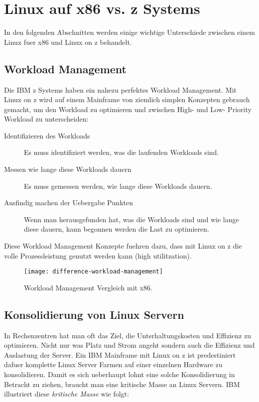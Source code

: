 \chapter{Linux auf x86 vs. z Systems}
\label{cha:Unterschiede}

In den folgenden Abschnitten werden einige wichtige Unterschiede zwischen einem Linux fuer x86 und Linux on z behandelt.

\section{Workload Management}
\label{sec:WorkloadManagement}

Die IBM z Systems haben ein nahezu perfektes Workload Management.
Mit Linux on z wird auf einem Mainframe von ziemlich simplen Konzepten gebrauch gemacht, um den Workload zu optimieren
und zwischen High- und Low- Priority Workload zu unterscheiden:\cite{IBMRedBookWorkloadConcept}

\begin{description}
    \item[Identifizieren des Workloads]{Es muss identifiziert werden, was die laufenden Workloads sind.}
    \item[Messen wie lange diese Workloads dauern]{Es muss gemessen werden, wie lange diese Workloads dauern.}
    \item[Ausfindig machen der Uebergabe Punkten]{Wenn man herausgefunden hat, was die Workloads sind und wie lange diese dauern, kann begonnen werden die Last zu optimieren.}
\end{description}

\newpage
Diese Workload Management Konzepte fuehren dazu, dass mit Linux on z die volle Prozessleistung genutzt werden kann (high utilitzation).

\begin{figure}[h!]
\centering
\texttt{[image: difference-workload-management]}
\caption{Workload Management Vergleich mit x86\cite{WorkloadManagement}.}
\label{fig:WorkloadManagement}
\end{figure}

\section{Konsolidierung von Linux Servern}
\label{sec:Konsolidierung}

In Rechenzentren hat man oft das Ziel, die Unterhaltungskosten und Effizienz zu optimieren.
Nicht nur was Platz und Strom angeht sondern auch die Effizienz und Auslastung der Server.
Ein IBM Mainframe mit Linux on z ist predestiniert dafuer komplette Linux Server Farmen auf einer
einzelnen Hardware zu konsolidieren.
Damit es sich ueberhaupt lohnt eine solche Konsolidierung in Betracht zu ziehen, braucht man eine kritische Masse
an Linux Servern. IBM illustriert diese \textit{kritische Masse} wie folgt:

